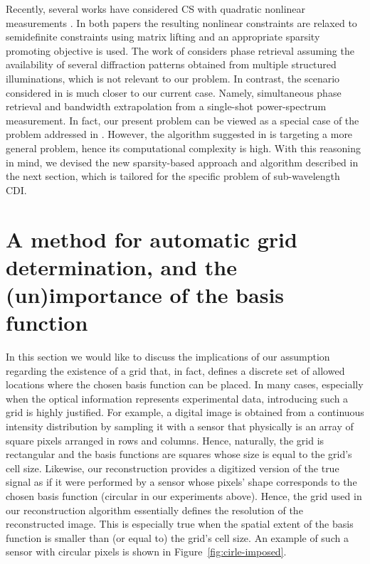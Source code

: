 Recently, several works have considered CS with quadratic nonlinear
measurements . In both papers
the resulting nonlinear constraints are relaxed to semidefinite
constraints using matrix lifting and an appropriate sparsity promoting
objective is used.  The work of  considers phase
retrieval assuming the availability of several diffraction patterns
obtained from multiple structured illuminations, which is not relevant
to our problem.  In contrast, the scenario considered in
 is much closer to our current case. Namely,
simultaneous phase retrieval and bandwidth extrapolation from a
single-shot power-spectrum measurement. In fact, our present problem
can be viewed as a special case of the problem addressed in
. However, the algorithm suggested in
 is targeting a more general problem, hence
its computational complexity is high. With this reasoning in mind, we
devised the new sparsity-based approach and algorithm described in
the next section, which is tailored for the specific
problem of sub-wavelength CDI.

\section{A method for automatic grid determination, and the
  (un)importance of the basis function}
\label{sec:choosing-grid-basis}
In this section we would like to discuss the implications of our
assumption regarding the existence of a grid that, in fact, defines a
discrete set of allowed locations where the chosen basis function can
be placed.  In many cases, especially when the optical information
represents experimental data, introducing such a grid is highly
justified. For example, a digital image is obtained from a continuous
intensity distribution by sampling it with a sensor that physically is
an array of square pixels arranged in rows and columns. Hence,
naturally, the grid is rectangular and the basis functions are squares
whose size is equal to the grid's cell size. Likewise, our
reconstruction provides a digitized version of the true signal as if
it were performed by a sensor whose pixels' shape corresponds to the
chosen basis function (circular in our experiments above). Hence, the
grid used in our reconstruction algorithm essentially defines the
resolution of the reconstructed image. This is especially true when
the spatial extent of the basis function is smaller than (or equal to)
the grid's cell size. An example of such a sensor with circular pixels
is shown in Figure~\ref{fig:cirle-imposed}.

